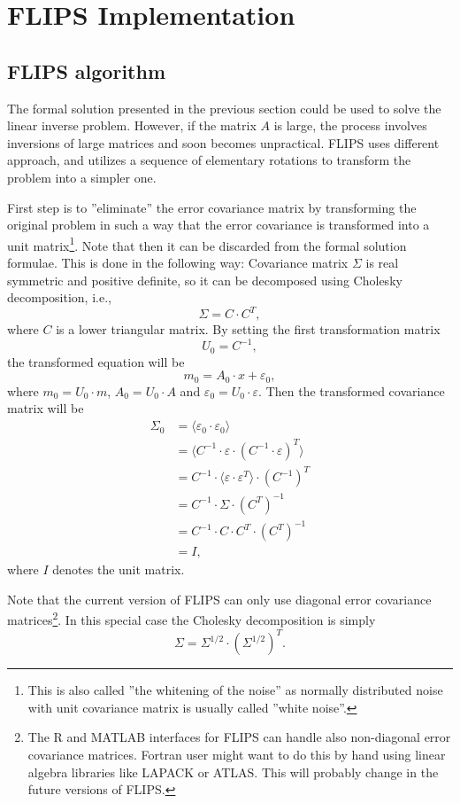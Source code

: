 \documentclass[a4paper,twoside]{refrep}
\newcommand{\ve}{\varepsilon}
\begin{document}
\chapter{FLIPS Implementation}\label{flipsimp}

\section{FLIPS algorithm}
The formal solution presented in the previous section could be used to solve the linear inverse problem. However, if the matrix $A$ is large, the process involves inversions of large matrices and soon becomes unpractical. FLIPS uses different approach, and utilizes a sequence of elementary rotations to transform the problem into a simpler one.

First step is to ''eliminate'' the error covariance matrix by transforming the original problem in such a way that the error covariance is transformed into a unit matrix\footnote{This is also called ''the whitening of the noise'' as normally distributed noise with unit covariance matrix is usually called ''white noise''.}. Note that then it can be discarded from the formal solution formulae. This is done in the following way: Covariance matrix $\Sigma$ is real symmetric and positive definite, so it can be decomposed using Cholesky decomposition, i.e.,
\[
\Sigma = C\cdot C^T,
\] 
where $C$ is a lower triangular matrix. By setting the first transformation matrix
\[
U_0 = C^{-1},
\]
the transformed equation will be
\[
m_0 = A_0\cdot x + \ve_0, 
\]
where $m_0 = U_0\cdot m$, $A_0 = U_0\cdot A$ and $\ve_0 = U_0\cdot \ve$. Then the transformed covariance matrix will be
\begin{align*}
\Sigma_0 & = \langle \ve_0\cdot\ve_0\rangle\\
& = \langle C^{-1}\cdot\ve\cdot(C^{-1}\cdot\ve)^T\rangle\\
& = C^{-1}\cdot\langle\ve\cdot\ve^T\rangle\cdot (C^{-1})^T\\
& = C^{-1}\cdot\Sigma\cdot (C^T)^{-1}\\
& = C^{-1}\cdot C\cdot C^T \cdot (C^T)^{-1}\\
& = I,
\end{align*}
where $I$ denotes the unit matrix.

\attention Note that the current version of FLIPS can only use diagonal error covariance matrices\footnote{The R and MATLAB interfaces for FLIPS can handle also non-diagonal error covariance matrices. Fortran user might want to do this by hand using linear algebra libraries like LAPACK or ATLAS. This will probably change in the future versions of FLIPS.}. In this special case the Cholesky decomposition is simply
\[
\Sigma = \Sigma^{1/2}\cdot(\Sigma^{1/2})^T.
\]
\end{document}
